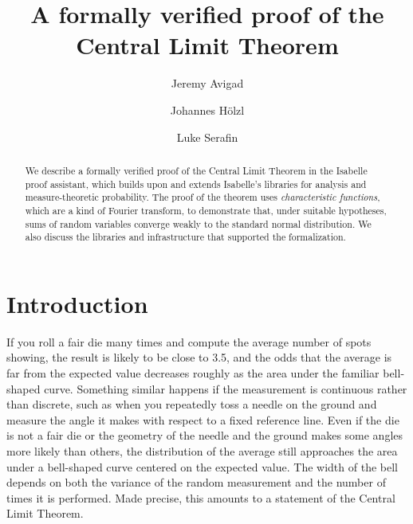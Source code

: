 \documentclass{svjour3}
\begin{document}
\title{A formally verified proof of the Central Limit Theorem}


\author{Jeremy Avigad \and Johannes H\"olzl \and Luke Serafin}


\maketitle

\begin{abstract}
We describe a formally verified proof of the Central Limit Theorem in the Isabelle proof assistant, which builds upon and extends Isabelle's libraries for analysis and measure-theoretic probability. 
The proof of the theorem uses \emph{characteristic functions}, which are a kind of Fourier transform, to demonstrate that, under suitable hypotheses, sums of random variables converge weakly to the standard normal distribution. We also discuss the libraries and infrastructure that supported the formalization.
\end{abstract}


\section{Introduction}
\label{section:introduction}

If you roll a fair die many times and compute the average number of spots showing, the result is likely to be close to 3.5, and the odds that the average is far from the expected value decreases roughly as the area under the familiar bell-shaped curve. Something similar happens if the measurement is continuous rather than discrete, such as when you repeatedly toss a needle on the ground and measure the angle it makes with respect to a fixed reference line. Even if the die is not a fair die or the geometry of the needle and the ground makes some angles more likely than others, the distribution of the average still approaches the area under a bell-shaped curve centered on the expected value. The width of the bell depends on both the variance of the random measurement and the number of times it is performed. Made precise, this amounts to a statement of the Central Limit Theorem.
\end{document}
